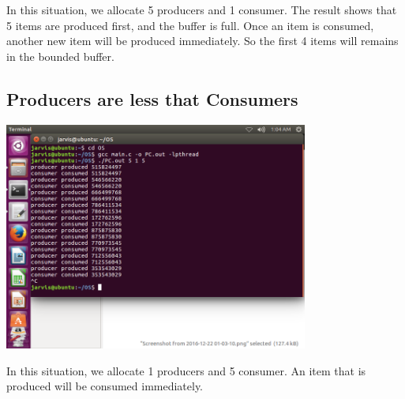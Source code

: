 \documentclass[a4paper, 11pt]{article}
\begin{document}
In this situation, we allocate 5 producers and 1 consumer. The result shows that 5 items are produced first, and the buffer is full. Once an item is consumed, another new item will be produced immediately. So the first 4 items will remains in the bounded buffer.
\subsection{Producers are less that Consumers}
\includegraphics[width=10cm]{pic/515.png}

In this situation, we allocate 1 producers and 5 consumer. An item that is produced will be consumed immediately.
\end{document}
